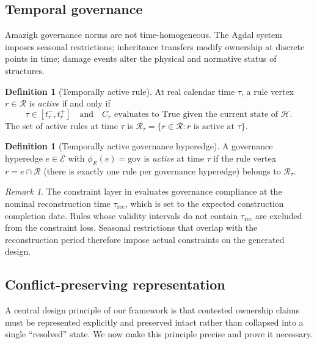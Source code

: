 \documentclass[11pt,a4paper]{article}
\theoremstyle{plain}
\theoremstyle{definition}
\newtheorem{definition}[theorem]{Definition}
\theoremstyle{remark}
\newtheorem{remark}[theorem]{Remark}
\newcommand{\HG}{\mathcal{H}}
\newcommand{\Rul}{\mathcal{R}}
\begin{document}
\subsection{Temporal governance}
\label{sec:layer2_temporal}

Amazigh governance norms are not time-homogeneous. The Agdal system
imposes seasonal restrictions; inheritance transfers modify ownership
at discrete points in time; damage events alter the physical and
normative status of structures.

\begin{definition}[Temporally active rule]
\label{def:active_rule}
At real calendar time $\tau$, a rule vertex $r \in \Rul$ is
\emph{active} if and only if
\[
  \tau \in [t_r^-, t_r^+]
  \quad \text{and} \quad
  C_r \text{ evaluates to } \mathrm{True}
  \text{ given the current state of } \HG.
\]
The set of active rules at time $\tau$ is
$\Rul_\tau = \{r \in \Rul : r \text{ is active at } \tau\}$.
\end{definition}

\begin{definition}[Temporally active governance hyperedge]
A governance hyperedge $e \in \mathcal{E}$ with $\phi_E(e) =
\mathrm{gov}$ is \emph{active} at time $\tau$ if the rule vertex
$r = e \cap \Rul$ (there is exactly one rule per governance
hyperedge) belongs to $\Rul_\tau$.
\end{definition}

\begin{remark}
The constraint layer in  evaluates governance
compliance at the nominal reconstruction time $\tau_{\mathrm{rec}}$,
which is set to the expected construction completion date. Rules
whose validity intervals do not contain $\tau_{\mathrm{rec}}$ are
excluded from the constraint loss. Seasonal restrictions that
overlap with the reconstruction period therefore impose actual
constraints on the generated design.
\end{remark}

\subsection{Conflict-preserving representation}
\label{sec:layer2_conflict}

A central design principle of our framework is that contested ownership
claims must be represented explicitly and preserved intact rather than
collapsed into a single ``resolved'' state. We now make this principle
precise and prove it necessary.
\end{document}
